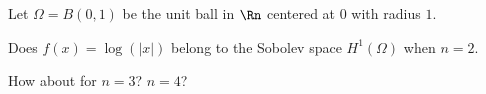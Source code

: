 Let $\Omega=B(0,1)$ be the unit ball in $\Rn$ centered at $0$ with
radius $1$.
\begin{alist}
\item Does $f(x)=\log(|x|)$ belong to the Sobolev space $H^1(\Omega)$
when $n=2$.
\item How about for $n=3$? $n=4$?
\end{alist}
